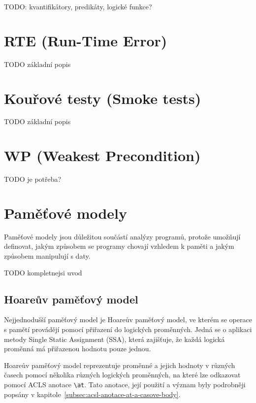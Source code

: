 TODO: kvantifikátory, predikáty, logické funkce?



\section{RTE (Run-Time Error)}
\label{sec:frama-c-rte}

TODO základní popis


\section{Kouřové testy (Smoke tests)}
\label{sec:frama-c-smoke-tests}

TODO základní popis


\section{WP (Weakest Precondition)}
\label{sec:frama-c-wp}

TODO je potřeba?


\section{Paměťové modely}
\label{sec:frama-c-pametove-modely}


Paměťové modely jsou důležitou součástí analýzy programů,
protože umožňují definovat, jakým způsobem se programy chovají
vzhledem k paměti a jakým způsobem manipulují s daty.

TODO kompletnejsi uvod

\subsection{Hoareův paměťový model}
\label{subsec:hoareuv-pametovy-model}

Nejjednodušší paměťový model je Hoareův paměťový model,
ve kterém se operace s pamětí provádějí pomocí přiřazení do logických proměnných.
Jedná se o aplikaci metody Single Static Assignment (SSA),
která zajišťuje, že každá logická proměnná má přiřazenou hodnotu pouze jednou.

Hoareův paměťový model reprezentuje proměnné a jejich hodnoty v různých časech
pomocí několika různých logických proměnných, na které lze odkazovat pomocí
ACLS anotace \texttt{\textbackslash at}.
Tato anotace, její použití a význam byly podrobněji popsány v kapitole~\ref{subsec:acsl-anotace-at-a-casove-body}.

